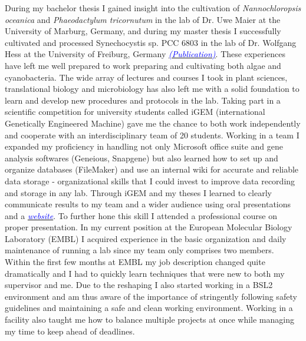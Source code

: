 \documentclass[11pt,a4paper,sans]{moderncv}
\begin{document}
\begin{spacing}{1.2}
During my bachelor thesis I gained insight into the cultivation of \textit{Nannochloropsis oceanica} and \textit{Phaeodactylum tricornutum} in the lab of Dr. Uwe Maier at the University of Marburg, Germany, and during my master thesis I successfully cultivated and processed Synechocystis sp. PCC 6803 in the lab of Dr. Wolfgang Hess at the University of Freiburg, Germany {\href{https://www.ncbi.nlm.nih.gov/pubmed/29517395}{\textcolor{blue}{{\textit{(Publication)}}}}}. These experiences have left me well prepared to work preparing and cultivating both algae and cyanobacteria. The wide array of lectures and courses I took in plant sciences, translational biology and microbiology has also left me with a solid foundation to learn and develop new procedures and protocols in the lab.\newline%
Taking part in a scientific competition for university students called iGEM (international Genetically Engineered Machine) gave me the chance to both work independently and cooperate with an interdisciplinary team of 20 students. Working in a team I expanded my proficiency in handling not only Microsoft office suite and gene analysis softwares (Geneious, Snapgene) but also learned how to set up and organize databases (FileMaker) and use an internal wiki for accurate and reliable data storage - organizational skills that I could invest to improve data recording and storage in any lab. Through iGEM and my theses I learned to clearly communicate results to my team and a wider audience using oral presentations and a {\href{http://2015.igem.org/Team:Freiburg}{\textcolor{blue}{\textit{website}}}}. To further hone this skill I attended a professional course on proper presentation.\newline%
In my current position at the European Molecular Biology Laboratory (EMBL) I acquired experience in the basic organization and daily maintenance of running a lab since my team only comprises two members. Within the first few months at EMBL my job description changed quite dramatically and I had to quickly learn techniques that were new to both my supervisor and me. Due to the reshaping I also started working in a BSL2 environment and am thus aware of the importance of stringently following safety guidelines and maintaining a safe and clean working environment. Working in a facility also taught me how to balance multiple projects at once while managing my time to keep ahead of deadlines.\par%


\end{spacing}
\end{document}
